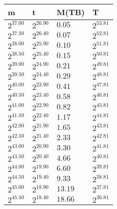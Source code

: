\begin{tabular}{llll}
m & t & M(TB) & T \\ \hline
$2^{37.00}$ & $2^{26.90}$ & $0.05$ & $2^{53.81}$ \\
$2^{37.50}$ & $2^{26.40}$ & $0.07$ & $2^{52.81}$ \\
$2^{38.00}$ & $2^{25.90}$ & $0.10$ & $2^{51.81}$ \\
$2^{38.50}$ & $2^{25.40}$ & $0.15$ & $2^{50.81}$ \\
$2^{39.00}$ & $2^{24.90}$ & $0.21$ & $2^{49.81}$ \\
$2^{39.50}$ & $2^{24.40}$ & $0.29$ & $2^{48.81}$ \\
$2^{40.00}$ & $2^{23.90}$ & $0.41$ & $2^{47.81}$ \\
$2^{40.50}$ & $2^{23.40}$ & $0.58$ & $2^{46.81}$ \\
$2^{41.00}$ & $2^{22.90}$ & $0.82$ & $2^{45.81}$ \\
$2^{41.50}$ & $2^{22.40}$ & $1.17$ & $2^{44.81}$ \\
$2^{42.00}$ & $2^{21.90}$ & $1.65$ & $2^{43.81}$ \\
$2^{42.50}$ & $2^{21.40}$ & $2.33$ & $2^{42.81}$ \\
$2^{43.00}$ & $2^{20.90}$ & $3.30$ & $2^{41.81}$ \\
$2^{43.50}$ & $2^{20.40}$ & $4.66$ & $2^{40.81}$ \\
$2^{44.00}$ & $2^{19.90}$ & $6.60$ & $2^{39.81}$ \\
$2^{44.50}$ & $2^{19.40}$ & $9.33$ & $2^{38.81}$ \\
$2^{45.00}$ & $2^{18.90}$ & $13.19$ & $2^{37.81}$ \\
$2^{45.50}$ & $2^{18.40}$ & $18.66$ & $2^{36.81}$ \\
\end{tabular}
